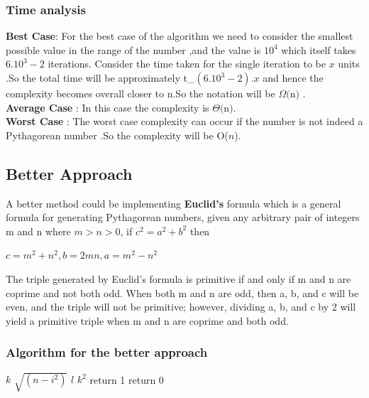 \documentclass[twocolumn]{article}      %
\begin{document}
\subsubsection{Time analysis}
\textbf{Best Case}: For the best case of the algorithm we need to consider the smallest possible value in the range of the number ,and the value is ${10^4}$ which itself takes ${6.10^3-2}$ iterations. Consider the time taken for the single iteration to be ${x}$ units .So the total time will be approximately t_\Omega \propto  ${(6.10^3-2)}.x$ and hence the complexity becomes overall closer to n.So the notation will be $\Omega($n$)$ .\\
\textbf{Average Case} : In this case the complexity is $\Theta($n$)$.\\
\textbf{Worst Case} : The worst case complexity can occur if the number is not indeed a Pythagorean number .So  the complexity will be O(${n}$).\\
\subsection{Better Approach}
A better method could be implementing \textbf{Euclid's} formula which is a general formula for generating Pythagorean numbers, given any arbitrary pair of integers m and n where $m>n>0$,  if $c^2=a^2+b^2$ then
\begin{center}
    \textbf{$c = m^2 + n^2 , b =2mn , a = m^2-n^2$}
\end{center}
 The triple generated by Euclid's formula is primitive if and only if m and n are coprime and not both odd. When both m and n are odd, then a, b, and c will be even, and the triple will not be primitive; however, dividing a, b, and c by 2 will yield a primitive triple when m and n are coprime and both odd.
\subsubsection{Algorithm for the better approach }
\begin{algorithm}
\begin{algorithmic}[1]
\State $k$ \gets \hspace{2pt} $\sqrt{(n - i^2)}$
\State $l$ \gets \hspace{2pt} $k^2$
\State return 1
\EndIf
\EndFor
\State return 0
\EndProcedure
\end{algorithmic}
\end{algorithm}
\end{document}
